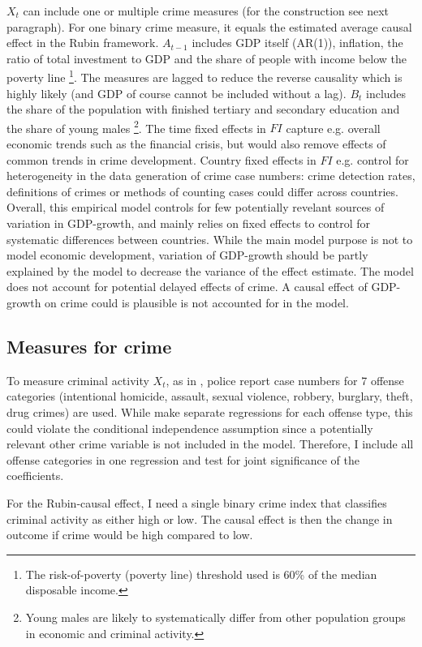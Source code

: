 \documentclass[a4paper,12pt]{article}
\begin{document}
$X_t$ can include one or multiple crime measures (for the construction see next paragraph). For one binary crime measure, it equals the estimated average causal effect in the Rubin framework.   $A_{t-1}$ includes GDP itself (AR(1)), inflation, the ratio of total investment to GDP and the share of people with income below the poverty line \footnote{The risk-of-poverty (poverty line) threshold used is 60\% of the median disposable income.}. The measures are lagged to reduce the reverse causality which is highly likely (and GDP of course cannot be included without a lag). $B_t$ includes the share of the population with finished tertiary and secondary education and the share of young males \footnote{Young males are likely to systematically differ from other population groups in economic and criminal activity.}. The time fixed effects in $FI$ capture e.g. overall economic trends such as the financial crisis, but would also remove effects of common trends in crime development. Country fixed effects in $FI$ e.g. control for heterogeneity in the data generation of crime case numbers: crime detection rates, definitions of crimes or methods of counting cases could differ across countries.
Overall, this empirical model controls for few potentially revelant sources of variation in GDP-growth, and mainly relies on fixed effects to control for systematic differences between countries. While the main model purpose is not to model economic development, variation of GDP-growth should be partly explained by the model to decrease the variance of the effect estimate. The model does not account for potential delayed effects of crime. A causal effect of GDP-growth on crime could is plausible is not accounted for in the model.

\subsection{Measures for crime}
To measure criminal activity $X_t$, as in \cite{entorf}, police report case numbers for 7 offense categories (intentional homicide, assault, sexual violence, robbery, burglary, theft, drug crimes) are used. While \cite{entorf} make separate regressions for each offense type, this could violate the conditional independence assumption since a potentially relevant other crime variable is not included in the model. Therefore, I include all offense categories in one regression and test for joint significance of the coefficients.

For the Rubin-causal effect, I need a single binary crime index that classifies criminal activity as either high or low. The causal effect is then the change in outcome if crime would be high compared to low.
\end{document}
